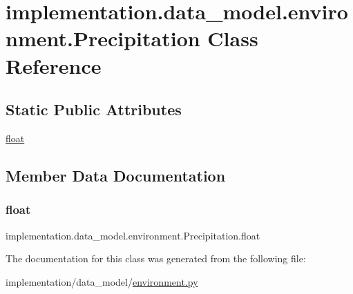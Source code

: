\hypertarget{classimplementation_1_1data__model_1_1environment_1_1_precipitation}{}\section{implementation.\+data\+\_\+model.\+environment.\+Precipitation Class Reference}
\label{classimplementation_1_1data__model_1_1environment_1_1_precipitation}
\subsection*{Static Public Attributes}
\begin{DoxyCompactItemize}
\item 
\hyperlink{classimplementation_1_1data__model_1_1environment_1_1_precipitation_a610ff2eb19f9f26135dbc16afb852992}{float}
\end{DoxyCompactItemize}


\subsection{Member Data Documentation}
\mbox{\label{classimplementation_1_1data__model_1_1environment_1_1_precipitation_a610ff2eb19f9f26135dbc16afb852992}} 
\subsubsection{\texorpdfstring{float}{float}}
{\footnotesize\ttfamily implementation.\+data\+\_\+model.\+environment.\+Precipitation.\+float\hspace{0.3cm}{\ttfamily [static]}}



The documentation for this class was generated from the following file\+:\begin{DoxyCompactItemize}
\item 
implementation/data\+\_\+model/\hyperlink{environment_8py}{environment.\+py}\end{DoxyCompactItemize}
